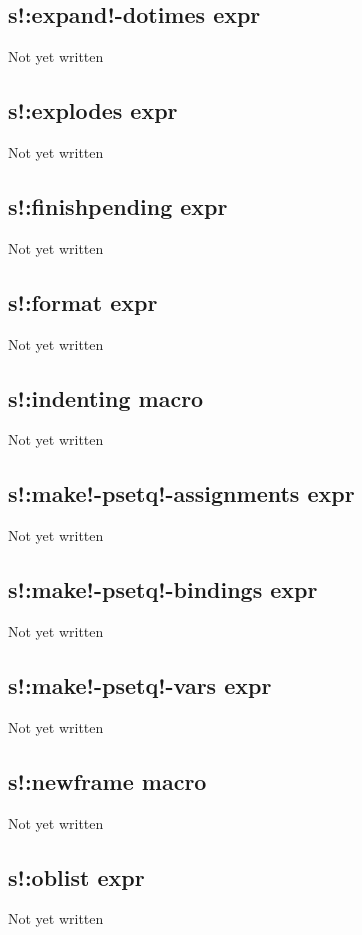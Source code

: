 \documentclass[a4paper,11pt]{article}
\begin{document}
{\subsection{\ttfamily s!:expand!-dotimes expr}
   Not yet written

\subsection{\ttfamily s!:explodes expr}
   Not yet written

\subsection{\ttfamily s!:finishpending expr}
   Not yet written

\subsection{\ttfamily s!:format expr}
   Not yet written

\subsection{\ttfamily s!:indenting macro}
   Not yet written

\subsection{\ttfamily s!:make!-psetq!-assignments expr}
   Not yet written

\subsection{\ttfamily s!:make!-psetq!-bindings expr}
   Not yet written

\subsection{\ttfamily s!:make!-psetq!-vars expr}
   Not yet written

\subsection{\ttfamily s!:newframe macro}
   Not yet written

\subsection{\ttfamily s!:oblist expr}
   Not yet written

}
\end{document}
